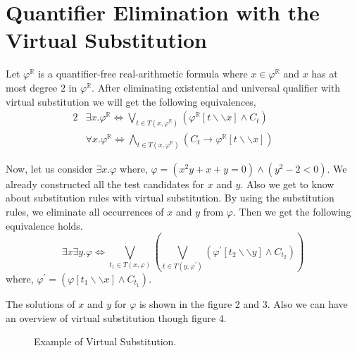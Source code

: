 \section{Quantifier Elimination with the Virtual Substitution}
\label{sec:quantifier-elimination-with-the-virtual-substitution}
Let $\varphi^\mathbb{R}$ is a quantifier-free real-arithmetic formula where $x\in \varphi^\mathbb{R}$ and $x$ has at most degree $2$ in $\varphi^\mathbb{R}$. After eliminating existential and universal qualifier with virtual substitution we will get the following equivalences,
\begin{alignat}{2}
	&\exists x. \varphi^\mathbb{R} \Longleftrightarrow \bigvee\limits_{t\in T(x,\varphi^\mathbb{R})}  (\varphi^\mathbb{R} [t\backslash\backslash x] \wedge C_t)\qquad   \\
	& \forall x. \varphi^\mathbb{R} \Longleftrightarrow \bigwedge\limits_{t\in T(x,\varphi^\mathbb{R})}  (C_{t}\rightarrow\varphi^\mathbb{R} [t\backslash\backslash x] )\qquad
\end{alignat}

Now, let us consider $\exists x.\varphi$ where, $\varphi = (x^{2}y + x + y = 0) \wedge (y^{2} -2 < 0)$. We already constructed all the test candidates for $x$ and $y$. Also we get to know about substitution rules with virtual substitution. By using the substitution rules, we eliminate all occurrences of $x$ and $y$ from $\varphi$. Then we get the following equivalence holds.
$$ \exists x\exists y. \varphi \Longleftrightarrow \bigvee\limits_{t_{1}\in T(x,\varphi)}(\bigvee\limits_{t\in T(y,\varphi^{\prime})}  (\varphi^{\prime} [t_{2}\backslash\backslash y] \wedge C_{t_{2}}))$$
where, $\varphi^{\prime} = (\varphi [t_{1}\backslash\backslash x] \wedge C_{t_{1}})$.
\begin{center}
	
\end{center}
The solutions of $x$ and $y$ for $\varphi$ is shown in the figure 2 and 3. Also we can have an overview of virtual substitution though figure 4.
\begin{figure}[htb] %
	\begin{center}
	
	\end{center}
	\caption{Example of Virtual Substitution.}
	\label{fig:graph}
\end{figure}

